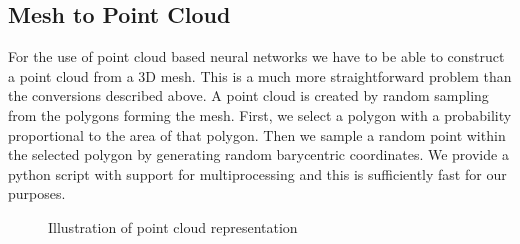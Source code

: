\subsection{Mesh to Point Cloud}
For the use of point cloud based neural networks we have to be able to construct a point cloud from a 3D mesh. This is a much more straightforward problem than the conversions described above. A point cloud is created by random sampling from the polygons forming the mesh. First, we select a polygon with a probability proportional to the area of that polygon. Then we sample a random point within the selected polygon by generating random barycentric coordinates. We provide a python script with support for multiprocessing and this is sufficiently fast for our purposes.  

\begin{figure}[!h]
	\centering
	\qquad
	\caption{Illustration of point cloud representation}
\end{figure}


